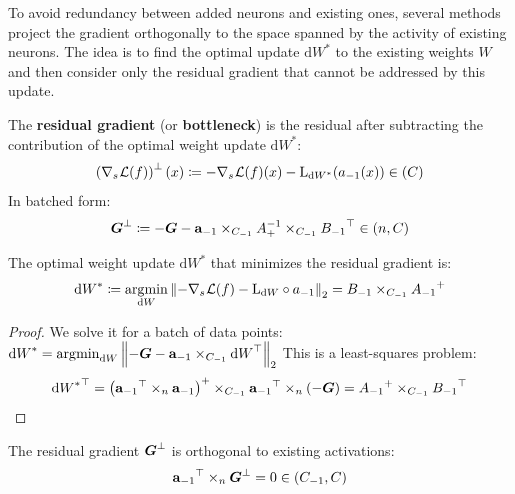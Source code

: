 To avoid redundancy between added neurons and existing ones, several
methods project the gradient orthogonally to the space spanned by
the activity of existing neurons. The idea is to find the optimal update
\({\mathrm{d}W}^{\ast}\) to the existing weights \(W\) and then consider
only the residual gradient that cannot be addressed by this update.



\begin{definition}

The \textbf{residual gradient} (or \textbf{bottleneck}) is the residual
after subtracting the contribution of the optimal weight update
\({\mathrm{d}W}^{\ast}\):
\[\left( {\nabla_{s_{}}\mathcal{L}(f)} \right)^{\bot}(x) \coloneqq - {\nabla_{s_{}}\mathcal{L}(f)}(x) - \mathrm{L}_{{\mathrm{d}W}^{\ast}}(a_{- 1}(x)) \in (C)\]
In batched form:
\[{\boldsymbol{G}^\perp} \coloneqq - \boldsymbol{G} - \mathbf{a}_{- 1} \times_{C_{- 1}}A_{+}^{- 1} \times_{C_{- 1}}{B_{- 1}}^{\top} \in (n,C)\]

\end{definition}

\begin{lemma}\label{lemma:optimal_dW}

The optimal weight update \({\mathrm{d}W}^{\ast}\) that minimizes the
residual gradient is:
\[{\mathrm{d}W}^{\ast} \coloneqq \operatorname*{\arg\!\min}_{\mathrm{d}W}\left\| {- {\nabla_{s_{}}\mathcal{L}(f)} - \mathrm{L}_{\mathrm{d}W} \circ a_{- 1}} \right\|_{2} = B_{- 1} \times_{C_{- 1}}{A_{- 1}}^{+}\]

\end{lemma}

\begin{proof}

We solve it for a batch of data points:
\({\mathrm{d}W}^{\ast} = \operatorname*{\arg\!\min}_{\mathrm{d}W}\left\| {- \boldsymbol{G} - \mathbf{a}_{- 1} \times_{C_{- 1}}{\mathrm{d}W}^{\top}} \right\|_{2}\)
This is a least-squares problem:
\[{{\mathrm{d}W}^{\ast}}^{\top} = \left( {\mathbf{a}_{- 1}}^{\top} \times_{n}\mathbf{a}_{- 1} \right)^{+} \times_{C_{- 1}}{\mathbf{a}_{- 1}}^{\top} \times_{n}\left( - \boldsymbol{G} \right) = {A_{- 1}}^{+} \times_{C_{- 1}}{B_{- 1}}^{\top}\]

\end{proof}

\begin{proposition}\label{prop:bottleneck_orthogonality}

The residual gradient \({\boldsymbol{G}^\perp}\) is orthogonal to existing
activations:
\[{\mathbf{a}_{- 1}}^{\top} \times_{n}{\boldsymbol{G}^\perp} = 0 \in \left( C_{- 1},C \right)\]

\end{proposition}

